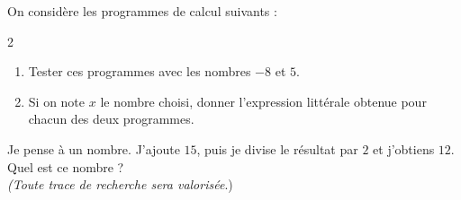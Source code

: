 \documentclass[11pt]{article}
\begin{document}
\newpage
\begin{exercicedevoir}[8]

On considère les programmes de calcul suivants :

\medskip

\begin{multicols}{2}


\columnbreak


\end{multicols}

\begin{enumerate}[label=\alph*)]
    \item Tester ces programmes avec les nombres $-8$ et $5$. \\ \encart{4cm}
    
    \item Si on note $x$ le nombre choisi, donner l'expression littérale obtenue pour chacun des deux programmes. \\ \encart{4cm}
\end{enumerate}

\end{exercicedevoir}
\begin{exercicedevoir}[4]
Je pense à un nombre. J'ajoute $15$, puis je divise le résultat par $2$ et j'obtiens $12$. \\
Quel est ce nombre ? \\
\textit{(Toute trace de recherche sera valorisée}.) \\ \encart{4cm}
\end{exercicedevoir}
\nonewpage
\end{document}
